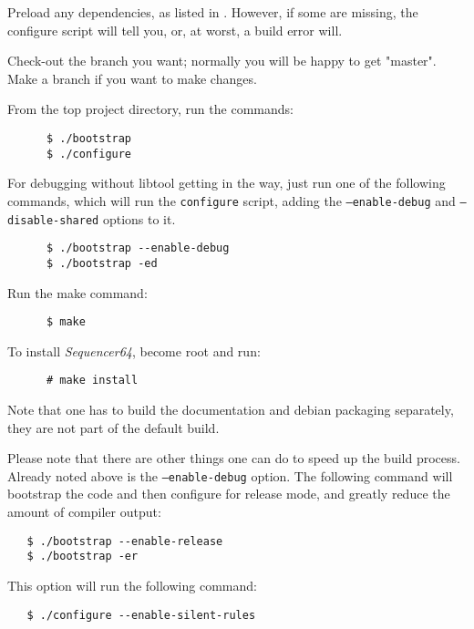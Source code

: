    \begin{enumber}
      \item Preload any dependencies, as listed in
         .
          However, if some are missing, the configure script will tell you,
          or, at worst, a build error will.
      \item Check-out the branch you want; normally you will be happy to
         get "master".  Make a branch if you want to make changes.
      \item From the top project directory, run the commands:
\begin{verbatim}
      $ ./bootstrap
      $ ./configure
\end{verbatim}
      \item For debugging without libtool getting in the way, just run
         one of the following commands, which will run the
         \texttt{configure} script, adding the
         \texttt{--enable-debug} and
         \texttt{--disable-shared} options to it.
\begin{verbatim}
      $ ./bootstrap --enable-debug
      $ ./bootstrap -ed
\end{verbatim}
      \item Run the make command:
\begin{verbatim}
      $ make
\end{verbatim}
      \item To install \textsl{Sequencer64}, become root and run:
\begin{verbatim}
      # make install
\end{verbatim}
   \end{enumber}

   Note that one has to build the documentation and debian packaging
   separately, they are not part of the default build.

   Please note that there are other things one can do to speed up the build
   process.  Already noted above is the \texttt{--enable-debug} option.
   The following command will bootstrap the code and then configure
   for release mode, and greatly reduce the amount of compiler output:
      
\begin{verbatim}
   $ ./bootstrap --enable-release
   $ ./bootstrap -er
\end{verbatim}

   This option will run the following command:

\begin{verbatim}
   $ ./configure --enable-silent-rules
\end{verbatim}

